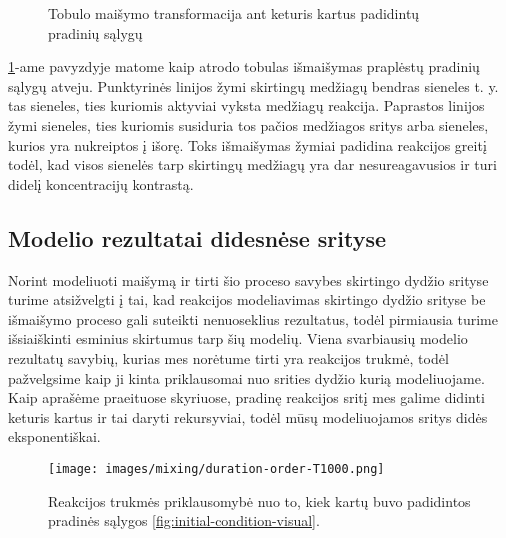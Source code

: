 \begin{figure}[!h]
\caption{Tobulo maišymo transformacija ant keturis kartus padidintų pradinių sąlygų}
\label{perfect-4x4-mix}
\end{figure}
\ref{perfect-4x4-mix}-ame pavyzdyje matome kaip atrodo tobulas išmaišymas praplėstų pradinių sąlygų atveju. Punktyrinės linijos žymi skirtingų medžiagų bendras sieneles t. y. tas sieneles, ties kuriomis aktyviai vyksta medžiagų reakcija. Paprastos linijos žymi sieneles, ties kuriomis susiduria tos pačios medžiagos sritys arba sieneles, kurios yra nukreiptos į išorę. Toks išmaišymas žymiai padidina reakcijos greitį todėl, kad visos sienelės tarp skirtingų medžiagų yra dar nesureagavusios ir turi didelį koncentracijų kontrastą.
\subsection{Modelio rezultatai didesnėse srityse}
Norint modeliuoti maišymą ir tirti šio proceso savybes skirtingo dydžio srityse turime atsižvelgti į tai, kad reakcijos modeliavimas skirtingo dydžio srityse be išmaišymo proceso gali suteikti nenuoseklius rezultatus, todėl pirmiausia turime išsiaiškinti esminius skirtumus tarp šių modelių. Viena svarbiausių modelio rezultatų savybių, kurias mes norėtume tirti yra reakcijos trukmė, todėl pažvelgsime kaip ji kinta priklausomai nuo srities dydžio kurią modeliuojame. Kaip aprašėme praeituose skyriuose, pradinę reakcijos sritį mes galime didinti keturis kartus ir tai daryti rekursyviai, todėl mūsų modeliuojamos sritys didės eksponentiškai.
\begin{figure}[h!]
    \centering
    \texttt{[image: images/mixing/duration-order-T1000.png]}

    \caption{Reakcijos trukmės priklausomybė nuo to, kiek kartų buvo padidintos pradinės sąlygos \eqref{fig:initial-condition-visual}. }

    \label{fig:duration-order-dependance}
\end{figure}
